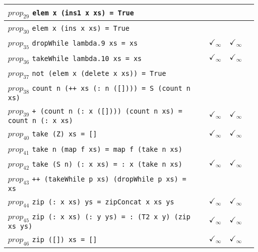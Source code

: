 \documentclass{article}
\begin{document}
\begin{longtable}{p{10cm} || c | c | c | c | }
\hline
$prop_{29}$ \newline \verb`elem x (ins1 x xs) = True` &  &  &  &  \\
\hline
$prop_{30}$ \newline \verb`elem x (ins x xs) = True` &  &  &  &  \\
\hline
$prop_{35}$ \newline \verb`dropWhile lambda.9 xs = xs` &  & $\checkmark_{\infty}$ & $\checkmark_{\infty}$ &  \\
\hline
$prop_{36}$ \newline \verb`takeWhile lambda.10 xs = xs` &  & $\checkmark_{\infty}$ & $\checkmark_{\infty}$ &  \\
\hline
$prop_{37}$ \newline \verb`not (elem x (delete x xs)) = True` &  &  &  &  \\
\hline
$prop_{38}$ \newline \verb`count n (++ xs (: n ([]))) = S (count n xs)` &  &  &  &  \\
\hline
$prop_{39}$ \newline \verb`+ (count n (: x ([]))) (count n xs) = count n (: x xs)` &  & $\checkmark_{\infty}$ & $\checkmark_{\infty}$ &  \\
\hline
$prop_{40}$ \newline \verb`take (Z) xs = []` &  & $\checkmark_{\infty}$ & $\checkmark_{\infty}$ &  \\
\hline
$prop_{41}$ \newline \verb`take n (map f xs) = map f (take n xs)` &  &  &  &  \\
\hline
$prop_{42}$ \newline \verb`take (S n) (: x xs) = : x (take n xs)` &  & $\checkmark_{\infty}$ & $\checkmark_{\infty}$ &  \\
\hline
$prop_{43}$ \newline \verb`++ (takeWhile p xs) (dropWhile p xs) = xs` &  &  &  &  \\
\hline
$prop_{44}$ \newline \verb`zip (: x xs) ys = zipConcat x xs ys` &  & $\checkmark_{\infty}$ & $\checkmark_{\infty}$ &  \\
\hline
$prop_{45}$ \newline \verb`zip (: x xs) (: y ys) = : (T2 x y) (zip xs ys)` &  & $\checkmark_{\infty}$ & $\checkmark_{\infty}$ &  \\
\hline
$prop_{46}$ \newline \verb`zip ([]) xs = []` &  & $\checkmark_{\infty}$ & $\checkmark_{\infty}$ &  \\

\end{longtable}
\end{document}
